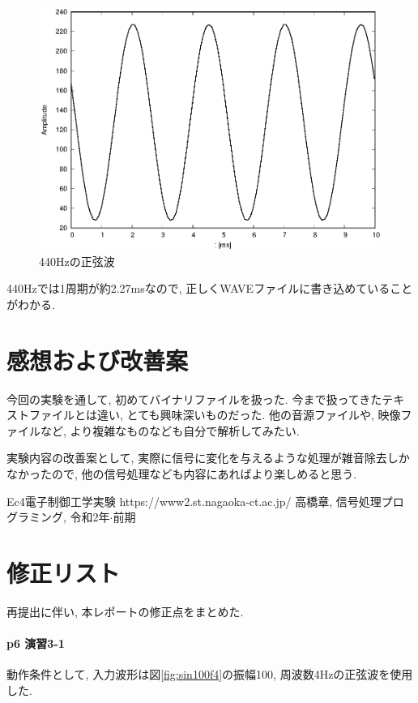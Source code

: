 \documentclass[titlepage]{jsarticle}
\begin{document}
            \begin{figure}[ht]
                \centering
                \includegraphics[width=12cm]{images/440.eps}
                \caption{440Hzの正弦波}
                \label{fig:440}
            \end{figure}

            440Hzでは1周期が約2.27msなので, 正しくWAVEファイルに書き込めていることがわかる.

\section{感想および改善案}
    今回の実験を通して, 初めてバイナリファイルを扱った.
    今まで扱ってきたテキストファイルとは違い, とても興味深いものだった.
    他の音源ファイルや, 映像ファイルなど, より複雑なものなども自分で解析してみたい.

    実験内容の改善案として, 実際に信号に変化を与えるような処理が雑音除去しかなかったので,
    他の信号処理なども内容にあればより楽しめると思う.

\begin{thebibliography}{99}
     Ec4電子制御工学実験 https://www2.st.nagaoka-ct.ac.jp/
     高橋章, 信号処理プログラミング, 令和2年$\cdot$前期
\end{thebibliography}

\newpage

\section{修正リスト}
再提出に伴い, 本レポートの修正点をまとめた.

\paragraph{p6 演習3-1} 動作条件として, 入力波形は図\ref{fig:sin100f4}の振幅100, 周波数4Hzの正弦波を使用した.
\end{document}
